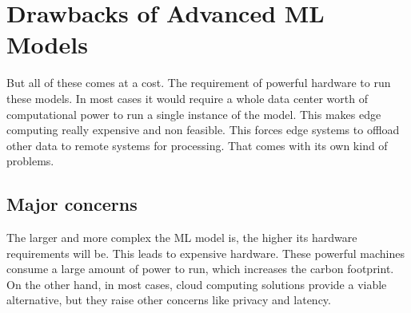 \documentclass[../../main]{subfiles}
\begin{document}
\section{Drawbacks of Advanced ML Models} \label{sec:}

But all of these comes at a cost. The requirement of powerful
hardware to run these models. In most cases it would require a whole
data center worth of computational power to run a single instance of
the model. This makes edge computing really expensive and non feasible.
This forces edge systems to offload other data to remote systems for
processing. That comes with its own kind of problems.

\subsection{Major concerns}

The larger and more complex the ML model is, the higher its hardware
requirements will be. This leads to expensive hardware. These powerful machines
consume a large amount of power to run, which increases the carbon footprint.
On the other hand, in most cases, cloud computing solutions provide a viable
alternative, but they raise other concerns like privacy and latency.
\end{document}

